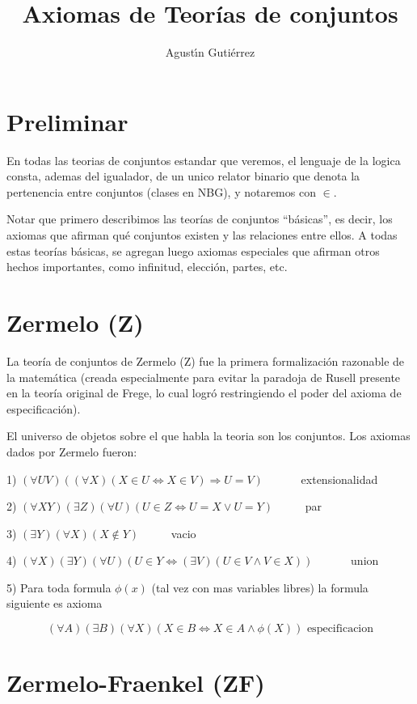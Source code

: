 \documentclass[12pt]{article}
\title{Axiomas de Teorías de conjuntos}
\author{Agust\'\i n Guti\'errez}
\date{}
\begin{document}
\maketitle

\section{Preliminar}

En todas las teorias de conjuntos estandar que veremos, el lenguaje de la logica consta, ademas del igualador, de un unico relator
binario que denota la pertenencia entre conjuntos (clases en NBG), y notaremos con $\in$.

Notar que primero describimos las teorías de conjuntos ``básicas'', es decir, los axiomas que afirman qué conjuntos existen y las relaciones
entre ellos. A todas estas teorías básicas, se agregan luego axiomas especiales que afirman otros hechos importantes, como infinitud, elección, partes, etc.


\section{Zermelo (Z)}

La teoría de conjuntos de Zermelo (Z) fue la primera formalización razonable de la matemática (creada especialmente para evitar la paradoja
de Rusell presente en la teoría original de Frege, lo cual logró restringiendo el poder del axioma de especificación).

El universo de objetos sobre el que habla la teoria son los conjuntos. Los axiomas dados por Zermelo fueron:

1) $(\forall UV) ((\forall X) (X \in U \Leftrightarrow X \in V) \Rightarrow U = V)$ \ \ \ \ \ \ extensionalidad

2) $(\forall XY) (\exists Z) (\forall U) (U \in Z \Leftrightarrow U = X \vee U = Y)$ \ \ \ \ \ par

3) $(\exists Y) (\forall X) (X \notin Y)$ \ \ \ \ \  vacio

4) $(\forall X) (\exists Y) (\forall U) (U \in Y \Leftrightarrow (\exists V) (U \in V \wedge V \in X))$ \ \ \ \ \ \ union

5) Para toda formula $\phi(x)$ (tal vez con mas variables libres) la formula siguiente es axioma

$$(\forall A) (\exists B) (\forall X) (X \in B \Leftrightarrow X \in A \wedge \phi(X)) \mbox{\ \ \ \ \ \ \ \ especificacion}$$

\section{Zermelo-Fraenkel (ZF)}
\end{document}
